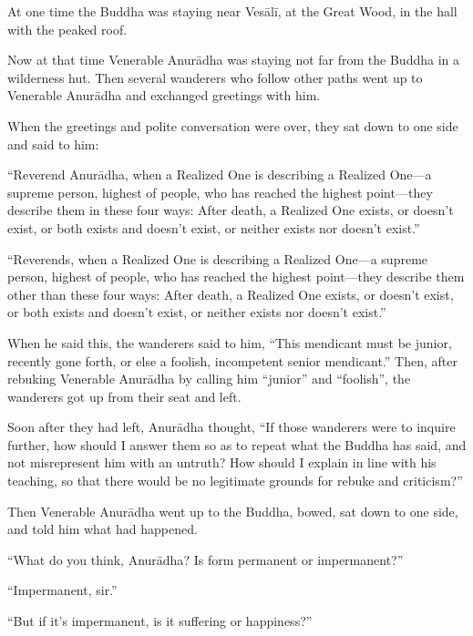 \documentclass[12pt,openany]{book}%
\begin{document}
At one time the Buddha was staying near \textsanskrit{Vesālī}, at the Great Wood, in the hall with the peaked roof. 

Now at that time Venerable \textsanskrit{Anurādha} was staying not far from the Buddha in a wilderness hut. Then several wanderers who follow other paths went up to Venerable \textsanskrit{Anurādha} and exchanged greetings with him. 

When the greetings and polite conversation were over, they sat down to one side and said to him: 

“Reverend \textsanskrit{Anurādha}, when a Realized One is describing a Realized One—a supreme person, highest of people, who has reached the highest point—they describe them in these four ways: After death, a Realized One exists, or doesn’t exist, or both exists and doesn’t exist, or neither exists nor doesn’t exist.” 

“Reverends, when a Realized One is describing a Realized One—a supreme person, highest of people, who has reached the highest point—they describe them other than these four ways: After death, a Realized One exists, or doesn’t exist, or both exists and doesn’t exist, or neither exists nor doesn’t exist.” 

When he said this, the wanderers said to him, “This mendicant must be junior, recently gone forth, or else a foolish, incompetent senior mendicant.” Then, after rebuking Venerable \textsanskrit{Anurādha} by calling him “junior” and “foolish”, the wanderers got up from their seat and left. 

Soon after they had left, \textsanskrit{Anurādha} thought, “If those wanderers were to inquire further, how should I answer them so as to repeat what the Buddha has said, and not misrepresent him with an untruth? How should I explain in line with his teaching, so that there would be no legitimate grounds for rebuke and criticism?” 

Then Venerable \textsanskrit{Anurādha} went up to the Buddha, bowed, sat down to one side, and told him what had happened. 

“What do you think, \textsanskrit{Anurādha}? Is form permanent or impermanent?” 

“Impermanent, sir.” 

“But if it’s impermanent, is it suffering or happiness?” 
\end{document}
